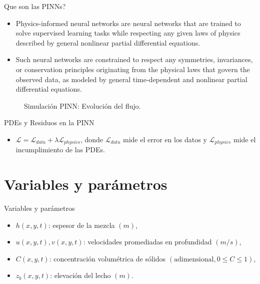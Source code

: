 \documentclass{beamer}
\begin{document}
\begin{frame}{Que son las PINNs?}
\begin{itemize}
    \item Physics-informed neural networks are neural networks that are trained to solve supervised learning tasks while respecting
    any given laws of physics described by general nonlinear partial differential equations. \cite{RAISSI2019686}
    \item Such neural networks are constrained to respect any symmetries, invariances, or conservation principles originating from
the physical laws that govern the observed data, as modeled by general time-dependent and nonlinear partial differential
equations.
\end{itemize}
\end{frame}



\begin{frame}
    \begin{figure}
    \centering
    \caption{Simulación PINN: Evolución del flujo.}
\end{figure}
\end{frame}

\begin{frame}{PDEs y Residuos en la PINN}
\begin{itemize}
    \item $\mathcal{L} = \mathcal{L}_{data} + \lambda \mathcal{L}_{physics}$, donde $\mathcal{L}_{data}$ mide el error en los datos y $\mathcal{L}_{physics}$ mide el incumplimiento de las PDEs.
\end{itemize}
\end{frame}

\section{Variables y parámetros}
\begin{frame}{Variables y parámetros}
\begin{itemize}
    \item $h(x, y, t)$: espesor de la mezcla $(m)$,
    \item $u(x, y, t), v(x, y, t)$: velocidades promediadas en profundidad $(m/s)$,
    \item $C(x, y, t)$: concentración volumétrica de sólidos $(\text{adimensional}, 0 \leq C \leq 1)$,
    \item $z_b(x, y, t)$: elevación del lecho $(m)$.
\end{itemize}
\end{frame}
\end{document}
